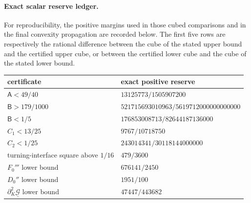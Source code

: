\paragraph{Exact scalar reserve ledger.}
For reproducibility, the positive margins used in those cubed comparisons
and in the final convexity propagation are recorded below.  The first five
rows are respectively the rational difference between the cube of the stated
upper bound and the certified upper cube, or between the certified lower cube
and the cube of the stated lower bound.
\begin{center}
\small
\begin{tabular}{@{}ll@{}}
\toprule
certificate&exact positive reserve\\
\midrule
\(\mathsf A<49/40\)&\(13125773/1505907200\)\\
\(\mathsf B>179/1000\)&
\(521715693010963/5619712000000000000\)\\
\(\mathsf B<1/5\)&\(176853008713/82644187136000\)\\
\(C_1<13/25\)&\(9767/10718750\)\\
\(C_2<1/25\)&\(243014341/30118144000000\)\\
turning-interface square above \(1/16\)&\(479/3600\)\\
\(F_0'''\) lower bound&\(676141/2450\)\\
\(D_0''\) lower bound&\(1951/100\)\\
\(\partial_K^2\underline{\mathcal G}\) lower bound&
\(47447/443682\)\\
\bottomrule
\end{tabular}
\end{center}

